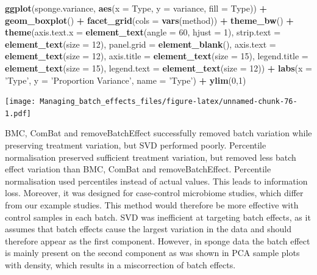 \documentclass[]{book}
\newenvironment{Shaded}{\begin{snugshade}}{\end{snugshade}}
\newcommand{\KeywordTok}[1]{\textcolor[rgb]{0.13,0.29,0.53}{\textbf{#1}}}
\newcommand{\DataTypeTok}[1]{\textcolor[rgb]{0.13,0.29,0.53}{#1}}
\newcommand{\DecValTok}[1]{\textcolor[rgb]{0.00,0.00,0.81}{#1}}
\newcommand{\StringTok}[1]{\textcolor[rgb]{0.31,0.60,0.02}{#1}}
\newcommand{\OperatorTok}[1]{\textcolor[rgb]{0.81,0.36,0.00}{\textbf{#1}}}
\newcommand{\NormalTok}[1]{#1}
\begin{document}
\begin{Shaded}
\begin{Highlighting}[]
\KeywordTok{ggplot}\NormalTok{(sponge.variance, }\KeywordTok{aes}\NormalTok{(}\DataTypeTok{x =}\NormalTok{ Type, }\DataTypeTok{y =}\NormalTok{ variance, }\DataTypeTok{fill =}\NormalTok{ Type)) }\OperatorTok{+}\StringTok{ }
\StringTok{  }\KeywordTok{geom_boxplot}\NormalTok{() }\OperatorTok{+}\StringTok{ }\KeywordTok{facet_grid}\NormalTok{(}\DataTypeTok{cols =} \KeywordTok{vars}\NormalTok{(method)) }\OperatorTok{+}\StringTok{ }\KeywordTok{theme_bw}\NormalTok{() }\OperatorTok{+}\StringTok{ }
\StringTok{  }\KeywordTok{theme}\NormalTok{(}\DataTypeTok{axis.text.x =} \KeywordTok{element_text}\NormalTok{(}\DataTypeTok{angle =} \DecValTok{60}\NormalTok{, }\DataTypeTok{hjust =} \DecValTok{1}\NormalTok{), }
        \DataTypeTok{strip.text =} \KeywordTok{element_text}\NormalTok{(}\DataTypeTok{size =} \DecValTok{12}\NormalTok{), }\DataTypeTok{panel.grid =} \KeywordTok{element_blank}\NormalTok{(), }
        \DataTypeTok{axis.text =} \KeywordTok{element_text}\NormalTok{(}\DataTypeTok{size =} \DecValTok{12}\NormalTok{), }\DataTypeTok{axis.title =} \KeywordTok{element_text}\NormalTok{(}\DataTypeTok{size =} \DecValTok{15}\NormalTok{), }
        \DataTypeTok{legend.title =} \KeywordTok{element_text}\NormalTok{(}\DataTypeTok{size =} \DecValTok{15}\NormalTok{), }\DataTypeTok{legend.text =} \KeywordTok{element_text}\NormalTok{(}\DataTypeTok{size =} \DecValTok{12}\NormalTok{)) }\OperatorTok{+}\StringTok{ }
\StringTok{  }\KeywordTok{labs}\NormalTok{(}\DataTypeTok{x =} \StringTok{'Type'}\NormalTok{, }\DataTypeTok{y =} \StringTok{'Proportion Variance'}\NormalTok{, }\DataTypeTok{name =} \StringTok{'Type'}\NormalTok{) }\OperatorTok{+}\StringTok{ }\KeywordTok{ylim}\NormalTok{(}\DecValTok{0}\NormalTok{,}\DecValTok{1}\NormalTok{)}
\end{Highlighting}
\end{Shaded}

\texttt{[image: Managing\_batch\_effects\_files/figure-latex/unnamed-chunk-76-1.pdf]}

BMC, ComBat and removeBatchEffect successfully removed batch variation
while preserving treatment variation, but SVD performed poorly.
Percentile normalisation preserved sufficient treatment variation, but
removed less batch effect variation than BMC, ComBat and
removeBatchEffect. Percentile normalisation used percentiles instead of
actual values. This leads to information loss. Moreover, it was designed
for case-control microbiome studies, which differ from our example
studies. This method would therefore be more effective with control
samples in each batch. SVD was inefficient at targeting batch effects,
as it assumes that batch effects cause the largest variation in the data
and should therefore appear as the first component. However, in sponge
data the batch effect is mainly present on the second component as was
shown in PCA sample plots with density, which results in a miscorrection
of batch effects.
\end{document}
